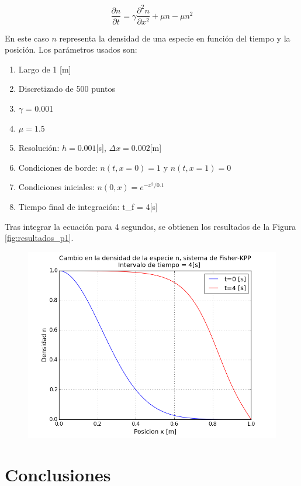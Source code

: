 \documentclass{article}
\begin{document}
\begin{equation}
  \frac{\partial n}{\partial t} = \gamma \frac{\partial^2n}{\partial x^2} + \mu n - \mu n^2
  \label{Fisher-KPP}
\end{equation}

En este caso $n$ representa la densidad de una especie en función del tiempo y la posición. Los parámetros usados son:

\begin{enumerate}
  \item Largo de 1 [m]
  \item Discretizado de 500 puntos
  \item $\gamma$ = 0.001
  \item $\mu  = 1.5$
  \item Resolución: $h = 0.001$[s], $\Delta x = 0.002$[m]
  \item Condiciones de borde: $n(t, x=0) = 1$ y $n(t, x=1) = 0$
  \item Condiciones iniciales: $ n(0, x) = e^{-x^2/0.1} $
  \item Tiempo final de integración: t_f = 4[s]
\end{enumerate}

Tras integrar la ecuación para 4 segundos, se obtienen los resultados de la Figura \ref{fig:resultados_p1}.

\begin{figure}
  \centering
  \includegraphics{images/resultados_p1.png}
\end{figure}



\section{Conclusiones}
\end{document}
